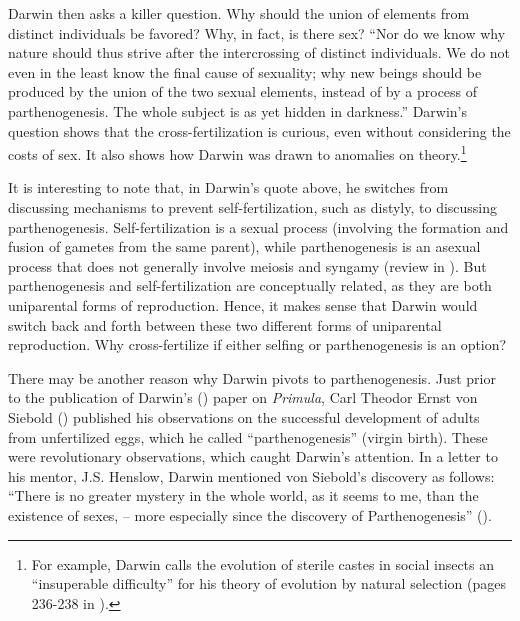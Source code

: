 \documentclass[
  american,
  letterpaper,
]{book}
\begin{document}
Darwin then asks a killer question. Why should the union of elements
from distinct individuals be favored? Why, in fact, is there sex? ``Nor
do we know why nature should thus strive after the intercrossing of
distinct individuals. We do not even in the least know the final cause
of sexuality; why new beings should be produced by the union of the two
sexual elements, instead of by a process of parthenogenesis. The whole
subject is as yet hidden in darkness.'' Darwin's question shows that the
cross-fertilization is curious, even without considering the costs of
sex. It also shows how Darwin was drawn to anomalies on
theory.\footnote{For example, Darwin calls the evolution of sterile
  castes in social insects an ``insuperable difficulty'' for his theory
  of evolution by natural selection (pages 236-238 in
  ).}

It is interesting to note that, in Darwin's quote above, he switches
from discussing mechanisms to prevent self-fertilization, such as
distyly, to discussing parthenogenesis. Self-fertilization is a sexual
process (involving the formation and fusion of gametes from the same
parent), while parthenogenesis is an asexual process that does not
generally involve meiosis and syngamy (review in
). But parthenogenesis and
self-fertilization are conceptually related, as they are both
uniparental forms of reproduction. Hence, it makes sense that Darwin
would switch back and forth between these two different forms of
uniparental reproduction. Why cross-fertilize if either selfing or
parthenogenesis is an option?

There may be another reason why Darwin pivots to parthenogenesis. Just
prior to the publication of Darwin's ()
paper on \emph{Primula}, Carl Theodor Ernst von Siebold
() published his observations on the
successful development of adults from unfertilized eggs, which he called
``parthenogenesis'' (virgin birth). These were revolutionary
observations, which caught Darwin's attention. In a letter to his
mentor, J.S. Henslow, Darwin mentioned von Siebold's discovery as
follows: ``There is no greater mystery in the whole world, as it seems
to me, than the existence of sexes, -- more especially since the
discovery of Parthenogenesis'' ().
\end{document}
